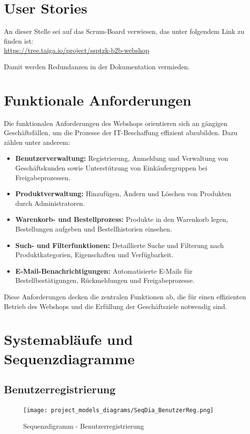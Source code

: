 \documentclass[%
	12pt,
	a4paper,
	oneside,
	parskip=full
]{scrbook}
\begin{document}
\section{User Stories}
An dieser Stelle sei auf das Scrum-Board verwiesen, das unter folgendem Link zu finden ist: \\
\url{https://tree.taiga.io/project/ssptzk-b2b-webshop}

Damit werden Redundanzen in der Dokumentation vermieden.

\section{Funktionale Anforderungen}
Die funktionalen Anforderungen des Webshops orientieren sich an gängigen Geschäftsfällen, um die Prozesse der IT-Beschaffung effizient abzubilden. Dazu zählen unter anderem:
\begin{itemize}
	\item \textbf{Benutzerverwaltung:} Registrierung, Anmeldung und Verwaltung von Geschäftskunden sowie Unterstützung von Einkäufergruppen bei Freigabeprozessen.
	\item \textbf{Produktverwaltung:} Hinzufügen, Ändern und Löschen von Produkten durch Administratoren.
	\item \textbf{Warenkorb- und Bestellprozess:} Produkte in den Warenkorb legen, Bestellungen aufgeben und Bestellhistorien einsehen.
	\item \textbf{Such- und Filterfunktionen:} Detaillierte Suche und Filterung nach Produktkategorien, Eigenschaften und Verfügbarkeit.
	\item \textbf{E-Mail-Benachrichtigungen:} Automatisierte E-Mails für Bestellbestätigungen, Rückmeldungen und Freigabeprozesse.
\end{itemize}

Diese Anforderungen decken die zentralen Funktionen ab, die für einen effizienten Betrieb des Webshops und die Erfüllung der Geschäftsziele notwendig sind.

\section{Systemabläufe und Sequenzdiagramme}

	\subsection{Benutzerregistrierung}
	\begin{figure}[H]
		\centering
		\texttt{[image: project\_models\_diagrams/SeqDia\_BenutzerReg.png]}
		\caption{Sequenzdigramm - Benutzerregistrierung}
	\end{figure}
	
\end{document}
